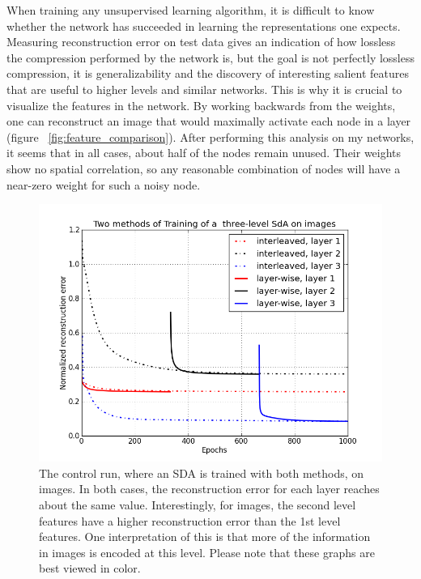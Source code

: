 \documentclass[12pt]{article}
\begin{document}
\begin{doublespacing}
	When training any unsupervised learning algorithm, it is difficult to know whether the network has succeeded in learning the representations one expects. Measuring reconstruction error on test data gives an indication of how lossless the compression performed by the network is, but the goal is not perfectly lossless compression, it is generalizability and the discovery of interesting salient features that are useful to higher levels and similar networks. This is why it is crucial to visualize the features in the network. By working backwards from the weights, one can reconstruct an image that would maximally activate each node in a layer (figure ~\ref{fig:feature_comparison}). After performing this analysis on my networks, it seems that in all cases, about half of the nodes remain unused. Their weights show no spatial correlation, so any reasonable combination of nodes will have a near-zero weight for such a noisy node.
	
\begin{figure}[p]
\centering
\includegraphics[width=6in]{graph_image_only}
\caption{The control run, where an SDA is trained with both methods, on images. In both cases, the reconstruction error for each layer reaches about the same value. Interestingly, for images, the second level features have a higher reconstruction error than the 1st level features. One interpretation of this is that more of the information in images is encoded at this level. Please note that these graphs are best viewed in color.}
\label{fig:graph_image_only}
\end{figure}


\end{doublespacing}
\end{document}
